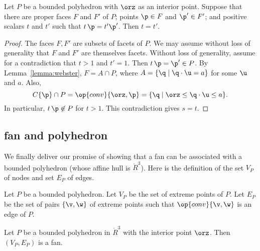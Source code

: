 \begin{lemma}[] \label{lemma:scale} 
Let $P$ be a bounded polyhedron with $\orz$ as an interior point.
Suppose that there are proper faces $F$ and $F'$ of $P$; points $\p\in F$ and
$\p'\in F'$; and positive scalars $t$ and $t'$ such that $t\, \p = t' \p'$.
Then $t=t'$.
\end{lemma}

\begin{proof} The faces $F,F'$ are subsets of facets of $P$.  We may assume
without loss of generality that $F$ and $F'$ are themselves facets.  Without
loss of generality, assume for a contradiction that $t>1$ and $t'=1$.
Then $t\, \p = \p'\in P$.
By Lemma~\ref{lemma:webster}, $F = A \cap P$, where $A= \{\q
\mid \q\cdot \u = a\}$ for some $\u$ and $a$.  Also,
\begin{displaymath}
C\{\p\}\cap P = \op{conv}\{\orz,\p\} = \{\q \mid \orz\le \q\cdot \u \le a\}.
\end{displaymath}
In particular, $t\, \p\not\in P$ for $t>1$.  This contradiction gives
$s = t$.
\end{proof}


\subsection{fan and polyhedron}

We finally deliver our promise of showing that a fan can be associated with
a bounded polyhedron (whose affine hull is $\ring{R}^3$).  Here is the definition
of the set $V_P$ of nodes and set $E_P$ of edges.

\begin{definition}[$V_P,E_P$]
Let $P$ be a bounded polyhedron.  Let
$V_P$ be the set of extreme points of $P$.  Let $E_P$ be the set of pairs
$\{\v,\w\}$ of extreme points such that $\op{conv}\{\v,\w\}$ is an edge of
$P$.
\end{definition}
%
%

\begin{lemma}\label{lemma:polyhedron}%
Let $P$ be a bounded polyhedron in $\ring{R}^3$ with the interior
point $\orz$.  Then $(V_P,E_P)$ is a fan.
\end{lemma}
%

